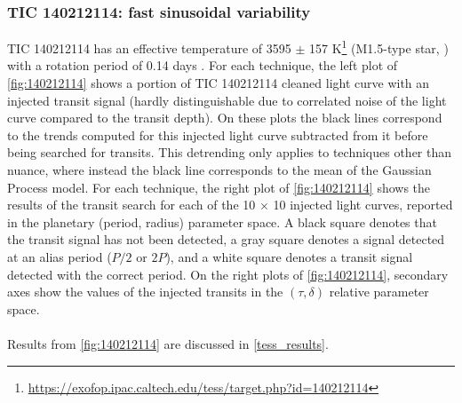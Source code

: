 \documentclass{aastex631}
\newcommand{\footlink}[1]{\footnote{\url{#1}}}
\begin{document}
\subsubsection{TIC 140212114: fast sinusoidal variability}\label{140212114}
TIC 140212114 has an effective temperature of 3595 $\pm$ 157 K\footlink{https://exofop.ipac.caltech.edu/tess/target.php?id=140212114} (M1.5-type star, \citealt{Rajpurohit2013}) with a rotation period of 0.14 days \citep{Ramsay2020}. For each technique, the left plot of \autoref{fig:140212114} shows a portion of TIC 140212114 cleaned light curve with an injected transit signal (hardly distinguishable due to correlated noise of the light curve compared to the transit depth). On these plots the black lines correspond to the trends computed for this injected light curve subtracted from it before being searched for transits. This detrending only applies to techniques other than \textsf{nuance}, where instead the black line corresponds to the mean of the Gaussian Process model. For each technique, the right plot of \autoref{fig:140212114} shows the results of the transit search for each of the 10 $\times$ 10 injected light curves, reported in the planetary (period, radius) parameter space. A black square denotes that the transit signal has not been detected, a gray square denotes a signal detected at an alias period ($P/2$ or $2P$), and a white square denotes a transit signal detected with the correct period. On the right plots of \autoref{fig:140212114}, secondary axes show the values of the injected transits in the $(\tau, \delta)$ relative parameter space.\\\\
Results from \autoref{fig:140212114} are discussed in \autoref{tess_results}.
\end{document}
